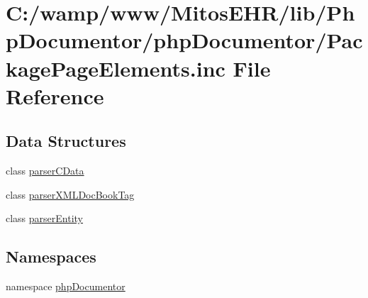\hypertarget{_package_page_elements_8inc}{\section{\-C\-:/wamp/www/\-Mitos\-E\-H\-R/lib/\-Php\-Documentor/php\-Documentor/\-Package\-Page\-Elements.inc \-File \-Reference}
\label{_package_page_elements_8inc}
}
\subsection*{\-Data \-Structures}
\begin{DoxyCompactItemize}
\item 
class \hyperlink{classparser_c_data}{parser\-C\-Data}
\item 
class \hyperlink{classparser_x_m_l_doc_book_tag}{parser\-X\-M\-L\-Doc\-Book\-Tag}
\item 
class \hyperlink{classparser_entity}{parser\-Entity}
\end{DoxyCompactItemize}
\subsection*{\-Namespaces}
\begin{DoxyCompactItemize}
\item 
namespace \hyperlink{namespacephp_documentor}{php\-Documentor}
\end{DoxyCompactItemize}
